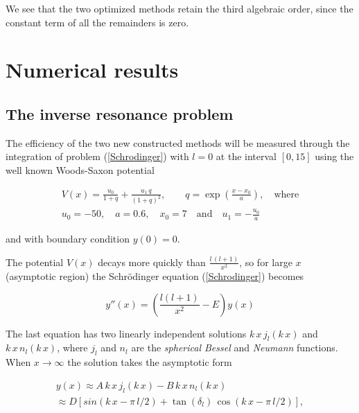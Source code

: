 \documentclass[numreferences]{kluwer}
\begin{document}
\begin{article}
We see that the two optimized methods retain the third algebraic order, since the constant term of all
the remainders is zero.

\section{Numerical results}
\label{Numerical_results}

\subsection{The inverse resonance problem}
The efficiency of the two new constructed methods will be measured through the integration of problem
(\ref{Schrodinger}) with $l=0$ at the interval $[0,15]$ using the well known Woods-Saxon potential

\begin{eqnarray}
\label{Woods_Saxon} V(x) = \frac{u_{0}}{1+q} + \frac{u_{1}\,q}{(1+q)^2}, \quad\quad q =
\exp{\left(\frac{x-x_{0}}{a}\right)}, \quad
\mbox{where}\\
\nonumber u_{0}=-50, \quad a=0.6, \quad x_{0}=7 \quad \mbox{and} \quad u_{1}=-\frac{u_{0}}{a}
\end{eqnarray}

\noindent and with boundary condition $y(0)=0$.

\noindent The potential $V(x)$ decays more quickly than $\frac{l\,(l+1)}{x^2}$, so for large $x$ (asymptotic region)
the Schr\"{o}dinger equation (\ref{Schrodinger}) becomes

\begin{equation}
\label{Schrodinger_reduced}
    y''(x) = \left( \frac{l(l+1)}{x^{2}}-E \right) y(x)
\end{equation}

\noindent The last equation has two linearly independent solutions $k\,x\,j_{l}(k\,x)$ and $k\,x\,n_{l}(k\,x)$, where
$j_{l}$ and $n_{l}$ are the \textit{spherical Bessel} and \textit{Neumann} functions. When $x \rightarrow \infty$ the
solution takes the asymptotic form

\begin{equation}
\label{asymptotic_solution}
\begin{array}{l}
 y(x) \approx A\,k\,x\,j_{l}(k\,x) - B\,k\,x\,n_{l}(k\,x) \\
\approx D[sin(k\,x - \pi\,l/2) + \tan(\delta_{l})\,\cos{(k\,x - \pi\,l/2)}],
\end{array}
\end{equation}


\end{article}
\end{document}
